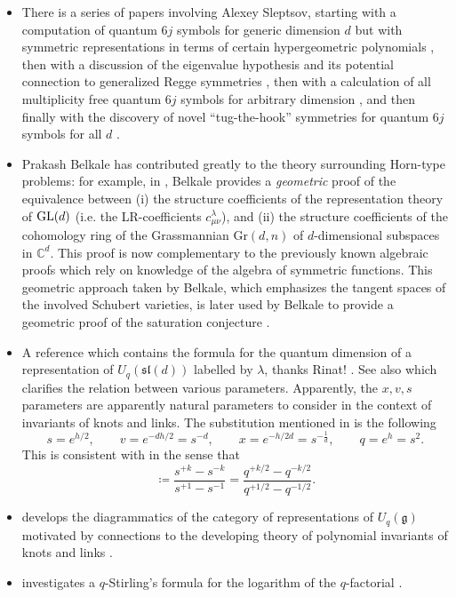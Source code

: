 \documentclass[notitlepage, 10pt]{article}
\begin{document}
\begin{itemize}
    \item There is a series of papers involving Alexey Sleptsov, starting with a computation of quantum $6j$ symbols for generic dimension $d$ but with symmetric representations in terms of certain hypergeometric polynomials \cite{mironov2017sixj}, then with a discussion of the eigenvalue hypothesis and its potential connection to generalized Regge symmetries \cite{morozov2018new}, then with a calculation of all multiplicity free quantum $6j$ symbols for arbitrary dimension \cite{alekseev2020multiplicity}, and then finally with the discovery of novel ``tug-the-hook'' symmetries for quantum $6j$ symbols for all $d$ \cite{lanina2023tug}.
    \item Prakash Belkale has contributed greatly to the theory surrounding Horn-type problems: for example, in \cite{belkale2004invariant}, Belkale provides a \textit{geometric} proof of the equivalence between (i) the structure coefficients of the representation theory of $\operatorname{GL}(d)$ (i.e. the LR-coefficients $c_{\mu\nu}^{\lambda}$), and (ii) the structure coefficients of the cohomology ring of the Grassmannian $\mathrm{Gr}(d, n)$ of $d$-dimensional subspaces in $\mathbb C^{d}$. 
        This proof is now complementary to the previously known algebraic proofs which rely on knowledge of the algebra of symmetric functions.
        This geometric approach taken by Belkale, which emphasizes the tangent spaces of the involved Schubert varieties, is later used by Belkale to provide a geometric proof of the saturation conjecture \cite{belkale2002geometric}.
    \item A reference which contains the formula for the quantum dimension of a representation of $U_{q}(\mathfrak{sl}(d))$ labelled by $\lambda$, thanks Rinat! \cite{aiston1997skein}. See also \cite{aiston1998idempotents} which clarifies the relation between various parameters. Apparently, the $x,v,s$ parameters are apparently natural parameters to consider in the context of invariants of knots and links. The substitution mentioned in \cite{aiston1998idempotents} is the following
        \begin{equation*}
            s = e^{h/2}, \qquad
            v = e^{-dh/2} = s^{-d}, \qquad
            x = e^{-h/2d} = s^{-\frac{1}{d}}, \qquad
            q = e^{h} = s^2.
        \end{equation*}
    This is consistent with \cite{reshetikhin1987quantized} in the sense that
    \begin{equation}
        [k] \coloneqq \frac{s^{+k} - s^{-k}}{s^{+1} - s^{-1}} = \frac{q^{+k/2} - q^{-k/2}}{q^{+1/2} - q^{-1/2}}.
    \end{equation}
    \item \citeauthor{reshetikhin1987quantized} develops the diagrammatics of the category of representations of $U_{q}(\mathfrak g)$ motivated by connections to the developing theory of polynomial invariants of knots and links \cite{reshetikhin1987quantized}.
    \item \citeauthor{moak1984q} investigates a $q$-Stirling's formula for the logarithm of the $q$-factorial \cite{moak1984q}.
\end{itemize}
\end{document}
